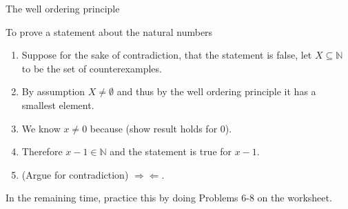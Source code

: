 \documentclass{beamer}
\def\bl[#1]#2{\begin{block}{#1}#2\end{block}}
\def\enumb{\begin{enumerate}}
\def\enume{\end{enumerate}}
\begin{document}
\begin{frame}{The well ordering principle}
\bl[To prove a statement about the natural numbers]{
\enumb
\item Suppose for the sake of contradiction, that the statement is false, let $X\subseteq \mathbb{N}$ to be the set of counterexamples.
\item By assumption $X\neq\emptyset$ and thus by the well ordering principle it has a smallest element.
\item We know $x\neq 0$ because (show result holds for $0$).
\item Therefore $x-1\in\mathbb{N}$ and the statement is true for $x-1$. 
\item (Argue for contradiction) $\Rightarrow\Leftarrow$.
\enume
}
\center In the remaining time, practice this by doing Problems 6-8 on the worksheet.
\end{frame}
\end{document}
